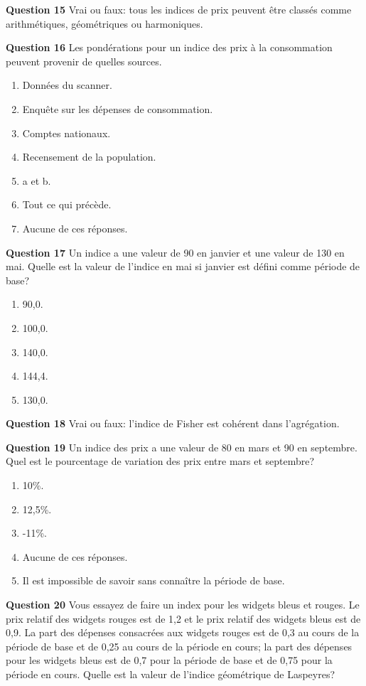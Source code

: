 \documentclass[
]{article}
\begin{document}
\textbf{Question 15} Vrai ou faux: tous les indices de prix peuvent être classés comme arithmétiques, géométriques ou harmoniques.

\textbf{Question 16} Les pondérations pour un indice des prix à la consommation peuvent provenir de quelles sources.

\begin{enumerate}
\def\labelenumi{\alph{enumi})}
\item
  Données du scanner.
\item
  Enquête sur les dépenses de consommation.
\item
  Comptes nationaux.
\item
  Recensement de la population.
\item
  a et b.
\item
  Tout ce qui précède.
\item
  Aucune de ces réponses.
\end{enumerate}

\textbf{Question 17} Un indice a une valeur de 90 en janvier et une valeur de 130 en mai. Quelle est la valeur de l'indice en mai si janvier est défini comme période de base?

\begin{enumerate}
\def\labelenumi{\alph{enumi})}
\item
  90,0.
\item
  100,0.
\item
  140,0.
\item
  144,4.
\item
  130,0.
\end{enumerate}

\textbf{Question 18} Vrai ou faux: l'indice de Fisher est cohérent dans l'agrégation.

\textbf{Question 19} Un indice des prix a une valeur de 80 en mars et 90 en septembre. Quel est le pourcentage de variation des prix entre mars et septembre?

\begin{enumerate}
\def\labelenumi{\alph{enumi})}
\item
  10\%.
\item
  12,5\%.
\item
  -11\%.
\item
  Aucune de ces réponses.
\item
  Il est impossible de savoir sans connaître la période de base.
\end{enumerate}

\textbf{Question 20} Vous essayez de faire un index pour les widgets bleus et rouges. Le prix relatif des widgets rouges est de 1,2 et le prix relatif des widgets bleus est de 0,9. La part des dépenses consacrées aux widgets rouges est de 0,3 au cours de la période de base et de 0,25 au cours de la période en cours; la part des dépenses pour les widgets bleus est de 0,7 pour la période de base et de 0,75 pour la période en cours. Quelle est la valeur de l'indice géométrique de Laspeyres?
\end{document}
